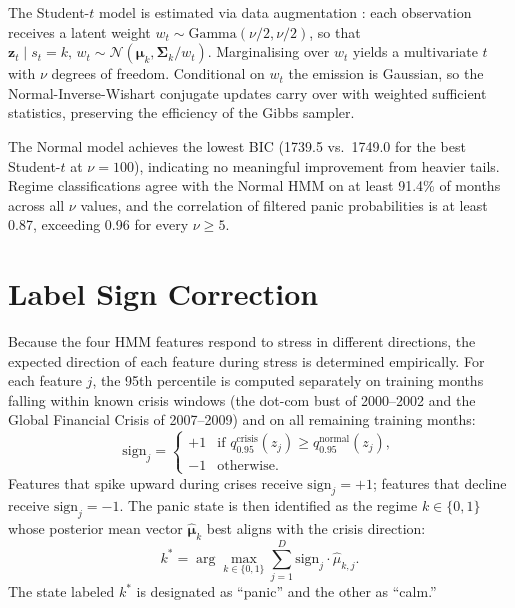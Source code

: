 The Student-$t$ model is estimated via data augmentation \citep{Geweke1993}: each observation receives a latent weight $w_t \sim \text{Gamma}(\nu/2, \nu/2)$, so that $\mathbf{z}_t \mid s_t{=}k,\, w_t \sim \mathcal{N}(\boldsymbol{\mu}_k, \boldsymbol{\Sigma}_k / w_t)$. Marginalising over $w_t$ yields a multivariate $t$ with $\nu$ degrees of freedom. Conditional on $w_t$ the emission is Gaussian, so the Normal-Inverse-Wishart conjugate updates carry over with weighted sufficient statistics, preserving the efficiency of the Gibbs sampler.



The Normal model achieves the lowest BIC (1739.5 vs.\ 1749.0 for the best Student-$t$ at $\nu = 100$), indicating no meaningful improvement from heavier tails. Regime classifications agree with the Normal HMM on at least 91.4\% of months across all $\nu$ values, and the correlation of filtered panic probabilities is at least 0.87, exceeding 0.96 for every $\nu \geq 5$.

\section{Label Sign Correction}\label{app:label_switching}

Because the four HMM features respond to stress in different directions, the expected direction of each feature during stress is determined empirically. For each feature $j$, the 95th percentile is computed separately on training months falling within known crisis windows (the dot-com bust of 2000--2002 and the Global Financial Crisis of 2007--2009) and on all remaining training months:
\begin{equation}
\text{sign}_j =
\begin{cases}
+1 & \text{if } q_{0.95}^{\text{crisis}}(z_j) \geq q_{0.95}^{\text{normal}}(z_j), \\
-1 & \text{otherwise}.
\end{cases}
\end{equation}
Features that spike upward during crises receive $\text{sign}_j = +1$; features that decline receive $\text{sign}_j = -1$. The panic state is then identified as the regime $k \in \{0, 1\}$ whose posterior mean vector $\hat{\boldsymbol{\mu}}_k$ best aligns with the crisis direction:
\begin{equation}
k^\ast = \arg\max_{k \in \{0,1\}} \sum_{j=1}^{D} \text{sign}_j \cdot \hat{\mu}_{k,j}.
\end{equation}
The state labeled $k^\ast$ is designated as ``panic'' and the other as ``calm.''

